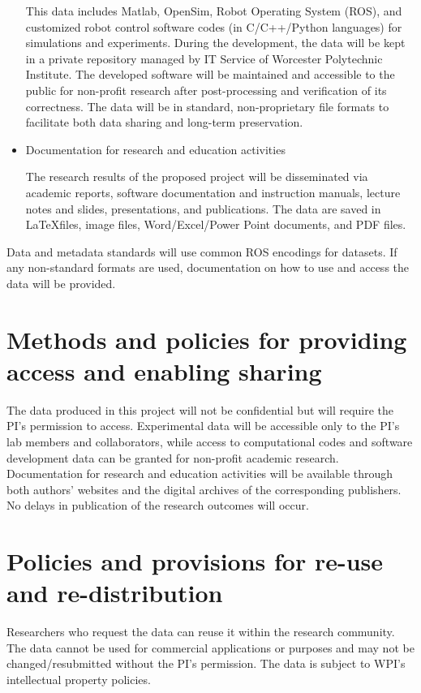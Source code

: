 \begin{itemize}
This data includes Matlab, OpenSim, Robot Operating System (ROS), and customized robot control software codes (in C/C++/Python languages) for simulations and experiments. During the development, the data will be kept in a private repository managed by IT Service of Worcester Polytechnic Institute. The developed software will be maintained and accessible to the public for non-profit research after post-processing and verification of its correctness. The data will be in standard, non-proprietary file formats to facilitate both data sharing and long-term preservation.

\item Documentation for research and education activities

The research results of the proposed project will be disseminated via academic reports, software documentation and instruction manuals, lecture notes and slides, presentations, and publications. The data are saved in \LaTeX files, image files, Word/Excel/Power Point documents, and PDF files. 
\end{itemize}

\noindent
Data and metadata standards will use common ROS encodings for datasets. If any non-standard formats are used, documentation on how to use and access the data will be provided.

\section{Methods and policies for providing access and enabling sharing}\label{sec:access}

The data produced in this project will not be confidential but will require the PI’s permission to access. Experimental data will be accessible only to the PI’s lab members and collaborators, while access to computational codes and software development data can be granted for non-profit academic research. Documentation for research and education activities will be available through both authors’ websites and the digital archives of the corresponding publishers. No delays in publication of the research outcomes will occur. 

\section{Policies and provisions for re-use and re-distribution}\label{sec:reuse}
Researchers who request the data can reuse it within the research community. The data cannot be used for commercial applications or purposes and may not be changed/resubmitted without the PI’s permission. The data is subject to WPI’s intellectual property policies.


